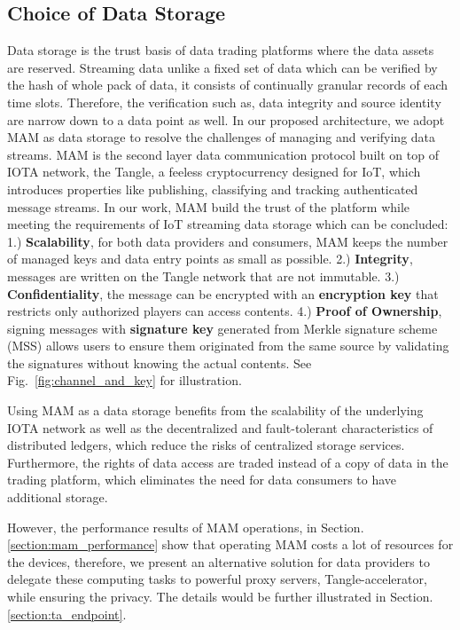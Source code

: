 \documentclass[conference]{IEEEtran}
\begin{document}
\subsection{Choice of Data Storage}
Data storage is the trust basis of data trading platforms where the data assets are reserved. Streaming data unlike a fixed set of data which can be verified by the hash of whole pack of data, it consists of continually granular records of each time slots. Therefore, the verification such as, data integrity and source identity are narrow down to a data point as well. In our proposed architecture, we adopt MAM as data storage to resolve the challenges of managing and verifying data streams. MAM is the second layer data communication protocol built on top of IOTA\cite{IOTAwhitepaper} network, the Tangle, a feeless cryptocurrency designed for IoT, which introduces properties like publishing, classifying and tracking authenticated message streams. In our work, MAM build the trust of the platform while meeting the requirements of IoT streaming data storage which can be concluded: 1.) \textbf{Scalability}, for both data providers and consumers, MAM keeps the number of managed keys and data entry points as small as possible. 2.) \textbf{Integrity}, messages are written on the Tangle network that are not immutable. 3.) \textbf{Confidentiality}, the message can be encrypted with an \textbf{encryption key} that restricts only authorized players can access contents. 4.) \textbf{Proof of Ownership}, signing messages with \textbf{signature key} generated from Merkle signature scheme\cite{MSS} (MSS) allows users to ensure them originated from the same source by validating the signatures without knowing the actual contents. See Fig.~\ref{fig:channel_and_key} for illustration. 

Using MAM as a data storage benefits from the scalability of the underlying IOTA network as well as the decentralized and fault-tolerant characteristics of distributed ledgers, which reduce the risks of centralized storage services. Furthermore, the rights of data access are traded instead of a copy of data in the trading platform, which eliminates the need for data consumers to have additional storage.

However, the performance results of MAM operations, in Section.\ref{section:mam_performance} show that operating MAM costs a lot of resources for the devices, therefore, we present an alternative solution for data providers to delegate these computing tasks to powerful proxy servers, Tangle-accelerator\cite{TA}, while ensuring the privacy. The details would be further illustrated in Section.\ref{section:ta_endpoint}. 
\end{document}
